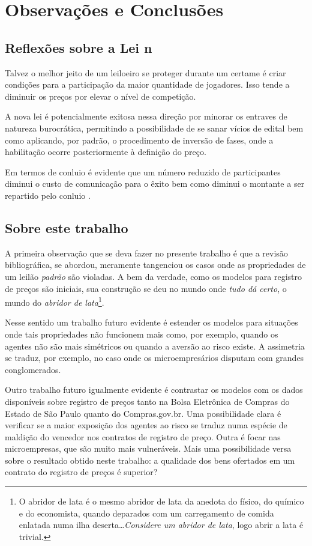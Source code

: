 \chapter{Observações e Conclusões}
\label{cap:conclusoes}

\section{Reflexões sobre a Lei n}
Talvez o melhor jeito de um leiloeiro se proteger durante um certame é criar condições para a participação da maior quantidade de jogadores. Isso tende a diminuir os preços por elevar o nível de competição.

A nova lei é potencialmente exitosa nessa direção por minorar os entraves de natureza burocrática, permitindo a possibilidade de se sanar vícios de edital bem como aplicando, por padrão, o procedimento de inversão de fases, onde a habilitação ocorre posteriormente à definição do preço.

Em termos de conluio é evidente que um número reduzido de participantes diminui o custo de comunicação para o êxito bem como diminui o montante a ser repartido pelo conluio \citet{pellegrini2018:MSc}.

\section{Sobre este trabalho}

A primeira observação que se deva fazer no presente trabalho é que a revisão bibliográfica, se abordou, meramente tangenciou os casos onde as propriedades de um leilão \emph{padrão} são violadas. A bem da verdade, como os modelos para registro de preços são iniciais, sua construção se deu no mundo onde \emph{tudo dá certo}, o mundo do \emph{abridor de lata}\footnote{O abridor de lata é o mesmo abridor de lata da anedota do físico, do químico e do economista, quando deparados com um carregamento de comida enlatada numa ilha deserta\ldots \emph{Considere um abridor de lata}, logo abrir a lata é trivial.}.

Nesse sentido um trabalho futuro evidente é estender os modelos para situações onde tais propriedades não funcionem mais como, por exemplo, quando os agentes não são mais simétricos ou quando a aversão ao risco existe. A assimetria se traduz, por exemplo, no caso onde os microempresários disputam com grandes conglomerados.

Outro trabalho futuro igualmente evidente é contrastar os modelos com os dados disponíveis sobre registro de preços tanto na Bolsa Eletrônica de Compras do Estado de São Paulo quanto do Compras.gov.br. Uma possibilidade clara é verificar se a maior exposição dos agentes ao risco se traduz numa espécie de maldição do vencedor nos contratos de registro de preço. Outra é focar nas microempresas, que são muito mais vulneráveis. Mais uma possibilidade versa sobre o resultado obtido neste trabalho: a qualidade dos bens ofertados em um contrato do registro de preços é superior?

